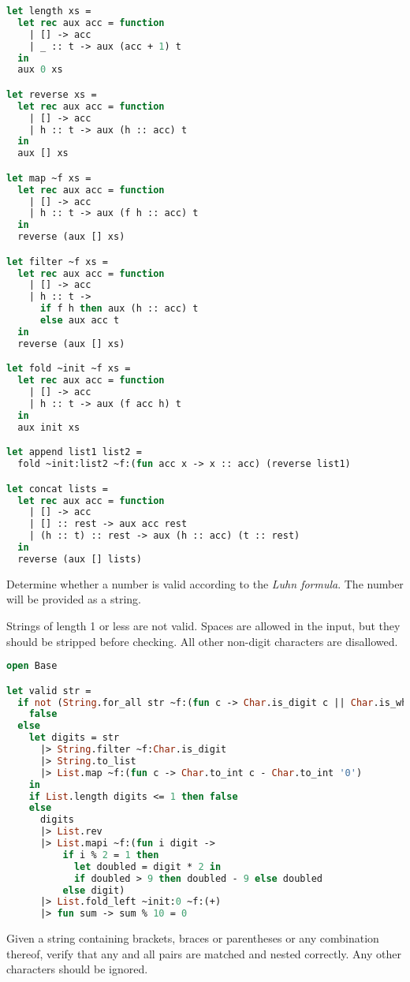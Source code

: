 \begin{lstlisting}[language=OCaml]
let length xs =
  let rec aux acc = function
    | [] -> acc
    | _ :: t -> aux (acc + 1) t
  in
  aux 0 xs

let reverse xs =
  let rec aux acc = function
    | [] -> acc
    | h :: t -> aux (h :: acc) t
  in
  aux [] xs

let map ~f xs =
  let rec aux acc = function
    | [] -> acc
    | h :: t -> aux (f h :: acc) t
  in
  reverse (aux [] xs)

let filter ~f xs =
  let rec aux acc = function
    | [] -> acc
    | h :: t ->
      if f h then aux (h :: acc) t
      else aux acc t
  in
  reverse (aux [] xs)

let fold ~init ~f xs =
  let rec aux acc = function
    | [] -> acc
    | h :: t -> aux (f acc h) t
  in
  aux init xs

let append list1 list2 =
  fold ~init:list2 ~f:(fun acc x -> x :: acc) (reverse list1)

let concat lists =
  let rec aux acc = function
    | [] -> acc
    | [] :: rest -> aux acc rest
    | (h :: t) :: rest -> aux (h :: acc) (t :: rest)
  in
  reverse (aux [] lists)
\end{lstlisting}

Determine whether a number is valid according to the \textit{Luhn formula}.
The number will be provided as a string.

Strings of length 1 or less are not valid.
Spaces are allowed in the input, but they should be stripped before checking.
All other non-digit characters are disallowed.

\begin{lstlisting}[language=OCaml]
open Base

let valid str =
  if not (String.for_all str ~f:(fun c -> Char.is_digit c || Char.is_whitespace c)) then
    false
  else
    let digits = str
      |> String.filter ~f:Char.is_digit
      |> String.to_list
      |> List.map ~f:(fun c -> Char.to_int c - Char.to_int '0')
    in
    if List.length digits <= 1 then false
    else
      digits
      |> List.rev
      |> List.mapi ~f:(fun i digit ->
          if i % 2 = 1 then
            let doubled = digit * 2 in
            if doubled > 9 then doubled - 9 else doubled
          else digit)
      |> List.fold_left ~init:0 ~f:(+)
      |> fun sum -> sum % 10 = 0
\end{lstlisting}

Given a string containing brackets, braces or parentheses or any combination thereof, verify that any and all pairs are matched and nested correctly.
Any other characters should be ignored.

